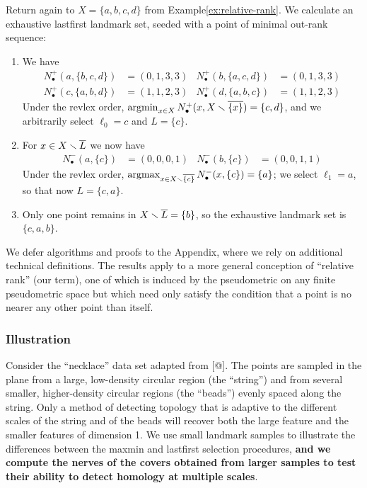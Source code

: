 \documentclass[
]{article}
\begin{document}
\begin{example}
    Return again to $X=\{a,b,c,d\}$ from Example\nbs\ref{ex:relative-rank}. We calculate an exhaustive lastfirst landmark set, seeded with a point of minimal out-rank sequence:
    \begin{enumerate}
        \item We have
        \begin{align*}
            N_\bullet^+(a,\{b,c,d\}) &= (0,1,3,3) &
            N_\bullet^+(b,\{a,c,d\}) &= (0,1,3,3) \\
            N_\bullet^+(c,\{a,b,d\}) &= (1,1,2,3) &
            N_\bullet^+(d,\{a,b,c\}) &= (1,1,2,3)
        \end{align*}
        Under the revlex order, $\operatorname{argmin}_{x\in X}{N_\bullet^+(x,X \smallsetminus \overline{\{x\}})}=\{c,d\}$, and we arbitrarily select $\ell_0=c$ and $L=\{c\}$.
        \item For $x \in X \smallsetminus \overline{L}$ we now have
        \begin{align*}
            N_\bullet^-(a,\{c\}) &= (0,0,0,1) &
            N_\bullet^-(b,\{c\}) &= (0,0,1,1)
        \end{align*}
        Under the revlex order, $\operatorname{argmax}_{x\in X \smallsetminus \overline{\{c\}}}{N_\bullet^-(x,\{c\})}=\{a\}$; we select $\ell_1=a$, so that now $L=\{c,a\}$.
        \item Only one point remains in $X\smallsetminus \overline{L}=\{b\}$, so the exhaustive landmark set is $\{c,a,b\}$.
    \end{enumerate}
\end{example}

We defer algorithms and proofs to the Appendix, where we rely on
additional technical definitions. The results apply to a more general
conception of ``relative rank'' (our term), one of which is induced by
the pseudometric on any finite pseudometric space but which need only
satisfy the condition that a point is no nearer any other point than
itself.

\hypertarget{illustration-1}{%
\subsubsection{Illustration}\label{illustration-1}}

Consider the ``necklace'' data set adapted from {[}@{]}. The points are
sampled in the plane from a large, low-density circular region (the
``string'') and from several smaller, higher-density circular regions
(the ``beads'') evenly spaced along the string. Only a method of
detecting topology that is adaptive to the different scales of the
string and of the beads will recover both the large feature and the
smaller features of dimension 1. We use small landmark samples to
illustrate the differences between the maxmin and lastfirst selection
procedures, \textbf{and we compute the nerves of the covers obtained
from larger samples to test their ability to detect homology at multiple
scales}.
\end{document}
